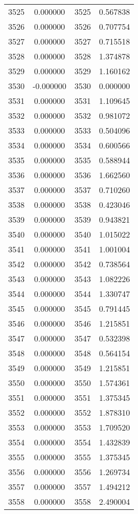 \documentclass[12pt]{article}
\begin{document}
\begin{longtable}{@{}cccc@{}}
3525 & 0.000000 & 3525 & 0.567838 \\
3526 & 0.000000 & 3526 & 0.707754 \\
3527 & 0.000000 & 3527 & 0.715518 \\
3528 & 0.000000 & 3528 & 1.374878 \\
3529 & 0.000000 & 3529 & 1.160162 \\
3530 & -0.000000 & 3530 & 0.000000 \\
3531 & 0.000000 & 3531 & 1.109645 \\
3532 & 0.000000 & 3532 & 0.981072 \\
3533 & 0.000000 & 3533 & 0.504096 \\
3534 & 0.000000 & 3534 & 0.600566 \\
3535 & 0.000000 & 3535 & 0.588944 \\
3536 & 0.000000 & 3536 & 1.662560 \\
3537 & 0.000000 & 3537 & 0.710260 \\
3538 & 0.000000 & 3538 & 0.423046 \\
3539 & 0.000000 & 3539 & 0.943821 \\
3540 & 0.000000 & 3540 & 1.015022 \\
3541 & 0.000000 & 3541 & 1.001004 \\
3542 & 0.000000 & 3542 & 0.738564 \\
3543 & 0.000000 & 3543 & 1.082226 \\
3544 & 0.000000 & 3544 & 1.330747 \\
3545 & 0.000000 & 3545 & 0.791445 \\
3546 & 0.000000 & 3546 & 1.215851 \\
3547 & 0.000000 & 3547 & 0.532398 \\
3548 & 0.000000 & 3548 & 0.564154 \\
3549 & 0.000000 & 3549 & 1.215851 \\
3550 & 0.000000 & 3550 & 1.574361 \\
3551 & 0.000000 & 3551 & 1.375345 \\
3552 & 0.000000 & 3552 & 1.878310 \\
3553 & 0.000000 & 3553 & 1.709520 \\
3554 & 0.000000 & 3554 & 1.432839 \\
3555 & 0.000000 & 3555 & 1.375345 \\
3556 & 0.000000 & 3556 & 1.269734 \\
3557 & 0.000000 & 3557 & 1.494212 \\
3558 & 0.000000 & 3558 & 2.490004 \\

\end{longtable}
\end{document}

